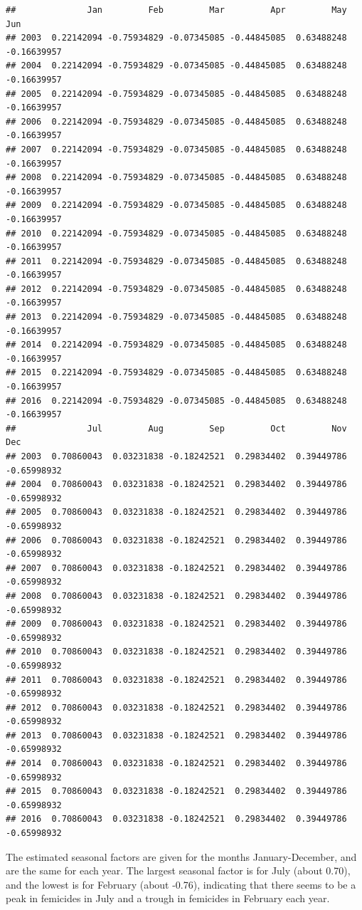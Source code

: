 \documentclass[]{book}
\begin{document}
\begin{verbatim}
##              Jan         Feb         Mar         Apr         May         Jun
## 2003  0.22142094 -0.75934829 -0.07345085 -0.44845085  0.63488248 -0.16639957
## 2004  0.22142094 -0.75934829 -0.07345085 -0.44845085  0.63488248 -0.16639957
## 2005  0.22142094 -0.75934829 -0.07345085 -0.44845085  0.63488248 -0.16639957
## 2006  0.22142094 -0.75934829 -0.07345085 -0.44845085  0.63488248 -0.16639957
## 2007  0.22142094 -0.75934829 -0.07345085 -0.44845085  0.63488248 -0.16639957
## 2008  0.22142094 -0.75934829 -0.07345085 -0.44845085  0.63488248 -0.16639957
## 2009  0.22142094 -0.75934829 -0.07345085 -0.44845085  0.63488248 -0.16639957
## 2010  0.22142094 -0.75934829 -0.07345085 -0.44845085  0.63488248 -0.16639957
## 2011  0.22142094 -0.75934829 -0.07345085 -0.44845085  0.63488248 -0.16639957
## 2012  0.22142094 -0.75934829 -0.07345085 -0.44845085  0.63488248 -0.16639957
## 2013  0.22142094 -0.75934829 -0.07345085 -0.44845085  0.63488248 -0.16639957
## 2014  0.22142094 -0.75934829 -0.07345085 -0.44845085  0.63488248 -0.16639957
## 2015  0.22142094 -0.75934829 -0.07345085 -0.44845085  0.63488248 -0.16639957
## 2016  0.22142094 -0.75934829 -0.07345085 -0.44845085  0.63488248 -0.16639957
##              Jul         Aug         Sep         Oct         Nov         Dec
## 2003  0.70860043  0.03231838 -0.18242521  0.29834402  0.39449786 -0.65998932
## 2004  0.70860043  0.03231838 -0.18242521  0.29834402  0.39449786 -0.65998932
## 2005  0.70860043  0.03231838 -0.18242521  0.29834402  0.39449786 -0.65998932
## 2006  0.70860043  0.03231838 -0.18242521  0.29834402  0.39449786 -0.65998932
## 2007  0.70860043  0.03231838 -0.18242521  0.29834402  0.39449786 -0.65998932
## 2008  0.70860043  0.03231838 -0.18242521  0.29834402  0.39449786 -0.65998932
## 2009  0.70860043  0.03231838 -0.18242521  0.29834402  0.39449786 -0.65998932
## 2010  0.70860043  0.03231838 -0.18242521  0.29834402  0.39449786 -0.65998932
## 2011  0.70860043  0.03231838 -0.18242521  0.29834402  0.39449786 -0.65998932
## 2012  0.70860043  0.03231838 -0.18242521  0.29834402  0.39449786 -0.65998932
## 2013  0.70860043  0.03231838 -0.18242521  0.29834402  0.39449786 -0.65998932
## 2014  0.70860043  0.03231838 -0.18242521  0.29834402  0.39449786 -0.65998932
## 2015  0.70860043  0.03231838 -0.18242521  0.29834402  0.39449786 -0.65998932
## 2016  0.70860043  0.03231838 -0.18242521  0.29834402  0.39449786 -0.65998932
\end{verbatim}

The estimated seasonal factors are given for the months January-December, and are the same for each year. The largest seasonal factor is for July (about 0.70), and the lowest is for February (about -0.76), indicating that there seems to be a peak in femicides in July and a trough in femicides in February each year.
\end{document}
